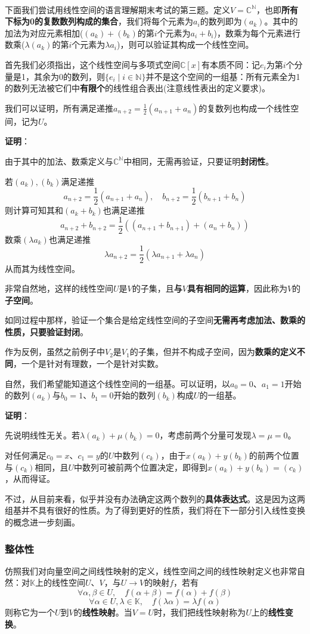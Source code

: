 \documentclass[a4paper,UTF8,fontset=windows,AutoFakeBold]{ctexart}
\newcommand*{\note}{\noindent *}
\newcommand{\proo}[1]{{\vspace{5pt}\kaishu\noindent\textbf{证明}：\vspace{-3pt}
\begin{compactitem}
    \item[] #1
\end{compactitem}
}}
\begin{document}
\

下面我们尝试用线性空间的语言理解期末考试的第三题。定义$V=\mathbb{C}^\mathbb{N}$，也即\textbf{所有下标为0的复数数列构成的集合}，我们将每个元素为$a_i$的数列即为$(a_k)$。其中的加法为对应元素相加($(a_k)+(b_k)$的第$i$个元素为$a_i+b_i$)，数乘为每个元素进行数乘($\lambda(a_k)$的第$i$个元素为$\lambda a_i$)，则可以验证其构成一个线性空间。

首先我们必须指出，这个线性空间与多项式空间$\mathbb{C}[x]$有本质不同：记$e_i$为第$i$个分量是1，其余为0的数列，则$\{e_i\mid i\in\mathbb{N}\}$并不是这个空间的一组基：所有元素全为1的数列无法被它们中\textbf{有限个}的线性组合表出(注意线性表出的定义要求)。

我们可以证明，所有满足递推$a_{n+2}=\frac{1}{2}(a_{n+1}+a_n)$的复数列也构成一个线性空间，记为$U$。

\proo{
    由于其中的加法、数乘定义与$\mathbb{C}^\mathbb{N}$中相同，无需再验证，只要证明\textbf{封闭性}。

    若$(a_k),(b_k)$满足递推
    $$a_{n+2}=\frac{1}{2}(a_{n+1}+a_n),\quad b_{n+2}=\frac{1}{2}(b_{n+1}+b_n)$$
    则计算可知其和$(a_k+b_k)$也满足递推
    $$a_{n+2}+b_{n+2}=\frac{1}{2}((a_{n+1}+b_{n+1})+(a_n+b_n))$$
    数乘$(\lambda a_k)$也满足递推
    $$\lambda a_{n+2}=\frac{1}{2}(\lambda a_{n+1}+\lambda a_n)$$
    从而其为线性空间。
}

非常自然地，这样的线性空间$U$是$V$的子集，且\textbf{与$V$具有相同的运算}，因此称为$V$的\textbf{子空间}。

\note 如同过程中那样，验证一个集合是给定线性空间的子空间\textbf{无需再考虑加法、数乘的性质，只要验证封闭}。

\note 作为反例，虽然之前例子中$V_2$是$V_1$的子集，但并不构成子空间，因为\textbf{数乘的定义不同}，一个是针对有理数，一个是针对实数。

自然，我们希望能知道这个线性空间的一组基。可以证明，以$a_0=0$、$a_1=1$开始的数列$(a_k)$与$b_0=1$、$b_1=0$开始的数列$(b_k)$构成$U$的一组基。

\proo{
    先说明线性无关。若$\lambda(a_k)+\mu(b_k)=0$，考虑前两个分量可发现$\lambda=\mu=0$。

    对任何满足$c_0=x$、$c_1=y$的$U$中数列$(c_k)$，由于$x(a_k)+y(b_k)$的前两个位置与$(c_k)$相同，且$U$中数列可被前两个位置决定，即得到$x(a_k)+y(b_k)=(c_k)$，从而得证。
}

不过，从目前来看，似乎并没有办法确定这两个数列的\textbf{具体表达式}。这是因为这两组基并不具有很好的性质。为了得到更好的性质，我们将在下一部分引入线性变换的概念进一步刻画。 

\subsubsection{整体性}
仿照我们对向量空间之间线性映射的定义，线性空间之间的线性映射定义也非常自然：对$\mathbb{K}$上的线性空间$U$、$V$，与$U\to V$的映射$f$，若有
$$\forall\alpha,\beta\in U,\quad f(\alpha+\beta)=f(\alpha)+f(\beta)$$
$$\forall\alpha\in U,\lambda\in\mathbb{K},\quad f(\lambda\alpha)=\lambda f(\alpha)$$
则称它为一个$U$到$V$的\textbf{线性映射}。当$V=U$时，我们把线性映射称为$U$上的\textbf{线性变换}。
\end{document}
